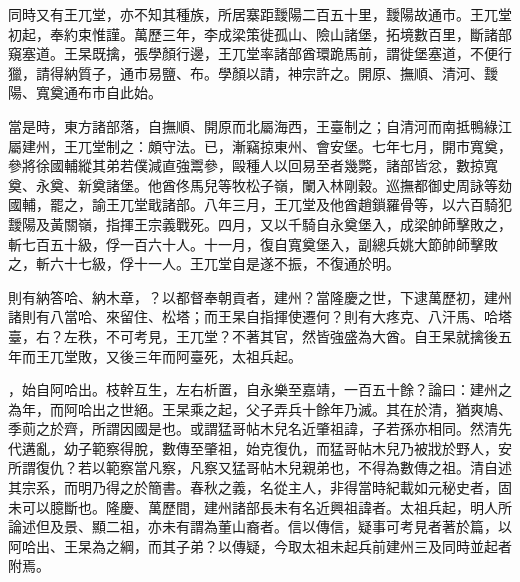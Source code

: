 \begin{pinyinscope}
同時又有王兀堂，亦不知其種族，所居寨距靉陽二百五十里，靉陽故通市。王兀堂初起，奉約束惟謹。萬歷三年，李成梁策徙孤山、險山諸堡，拓境數百里，斷諸部窺塞道。王杲既擒，張學顏行邊，王兀堂率諸部酋環跪馬前，謂徙堡塞道，不便行獵，請得納質子，通市易鹽、布。學顏以請，神宗許之。開原、撫順、清河、靉陽、寬奠通布市自此始。

當是時，東方諸部落，自撫順、開原而北屬海西，王臺制之；自清河而南抵鴨綠江屬建州，王兀堂制之：頗守法。已，漸竊掠東州、會安堡。七年七月，開市寬奠，參將徐國輔縱其弟若僕減直強鬻參，毆種人以回易至者幾斃，諸部皆忿，數掠寬奠、永奠、新奠諸堡。他酋佟馬兒等牧松子嶺，闌入林剛穀。巡撫都御史周詠等劾國輔，罷之，諭王兀堂戢諸部。八年三月，王兀堂及他酋趙鎖羅骨等，以六百騎犯靉陽及黃關嶺，指揮王宗義戰死。四月，又以千騎自永奠堡入，成梁帥師擊敗之，斬七百五十級，俘一百六十人。十一月，復自寬奠堡入，副總兵姚大節帥師擊敗之，斬六十七級，俘十一人。王兀堂自是遂不振，不復通於明。

則有納答哈、納木章，？以都督奉朝貢者，建州？當隆慶之世，下逮萬歷初，建州諸則有八當哈、來留住、松塔；而王杲自指揮使遷何？則有大疼克、八汗馬、哈塔臺，右？左秩，不可考見，王兀堂？不著其官，然皆強盛為大酋。自王杲就擒後五年而王兀堂敗，又後三年而阿臺死，太祖兵起。

，始自阿哈出。枝幹互生，左右析置，自永樂至嘉靖，一百五十餘？論曰：建州之為年，而阿哈出之世絕。王杲乘之起，父子弄兵十餘年乃滅。其在於清，猶爽鳩、季荝之於齊，所謂因國是也。或謂猛哥帖木兒名近肇祖諱，子若孫亦相同。然清先代遘亂，幼子範察得脫，數傳至肇祖，始克復仇，而猛哥帖木兒乃被戕於野人，安所謂復仇？若以範察當凡察，凡察又猛哥帖木兒親弟也，不得為數傳之祖。清自述其宗系，而明乃得之於簡書。春秋之義，名從主人，非得當時紀載如元秘史者，固未可以臆斷也。隆慶、萬歷間，建州諸部長未有名近興祖諱者。太祖兵起，明人所論述但及景、顯二祖，亦未有謂為董山裔者。信以傳信，疑事可考見者著於篇，以阿哈出、王杲為之綱，而其子弟？以傳疑，今取太祖未起兵前建州三及同時並起者附焉。


\end{pinyinscope}